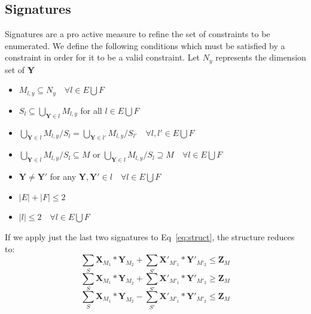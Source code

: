 \documentclass{article}
\newcommand{\TX}{\textbf{X}\xspace}
\newcommand{\TY}{\textbf{Y}\xspace}
\newcommand{\TZ}{\textbf{Z}\xspace}
\begin{document}
\subsection{Signatures}
\label{subsec:signatures}
Signatures are a pro active measure to refine the set of constraints to be enumerated. We define the following conditions which must be satisfied by a constraint in order for it to be a valid constraint. Let $N_y$ represents the dimension set of \TY
\begin{itemize}
            \item $M_{l,y} \subseteq N_y \quad \forall l \in E \bigcup F$
            \item $S_{l} \subseteq \bigcup_{\TY \in l} M_{l,y}$ for all $l \in E \bigcup F$
            \item $\bigcup_{\TY \in l} M_{l,y} / S_{l} = \bigcup_{\TY \in l'} M_{l,y} / S_{l'}\quad \forall l,l' \in E \bigcup F$
            \item $\bigcup_{\TY \in l} M_{l,y} / S_{l} \subseteq M$ or
            $\bigcup_{\TY \in l} M_{l,y} / S_{l} \supseteq M\quad \forall l \in E \bigcup F$
            
            \item $\TY \ne \TY'$ for any $\TY,\TY' \in l \quad \forall l \in E \bigcup F$
            \item $|E|+|F| \le 2$
            \item $|l| \le 2\quad \forall l \in E \bigcup F$
\end{itemize}
If we apply just the last two signatures to Eq~\ref{eq:struct}, the structure reduces to:
\begin{equation}
\label{eq:one}
	\displaystyle\sum_{S} \TX_{M_1} *\TY_{M_2}
	+\sum_{S'} \TX'_{M'_1} *\TY'_{M'_2} \le \TZ_{M}
\end{equation}
\begin{equation}
\label{eq:two}
	\displaystyle\sum_{S} \TX_{M_1} *\TY_{M_2}
	+\sum_{S'} \TX'_{M'_1} *\TY'_{M'_2} \geq \TZ_{M}
\end{equation}
\begin{equation}
\label{eq:three}
	\displaystyle\sum_{S} \TX_{M_1} *\TY_{M_2}
	-\sum_{S'} \TX'_{M'_1} *\TY'_{M'_2} \le \TZ_{M}
\end{equation}
\end{document}
